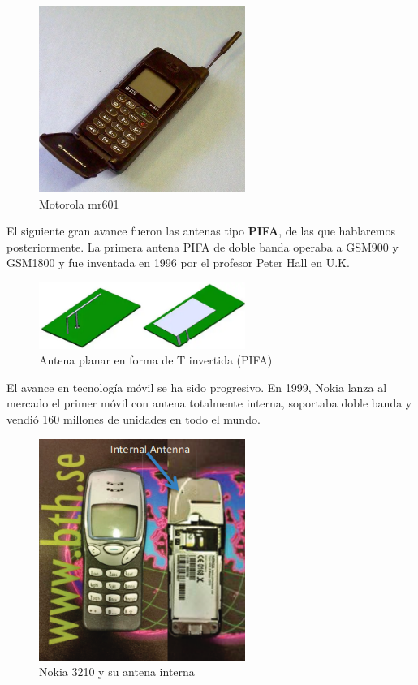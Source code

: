 \documentclass[a4paper,11pt,titlepage]{article}
\begin{document}
\begin{figure}[H]
\centering
\includegraphics[width=0.6\textwidth]{motorolamr601}
\caption{Motorola mr601}
\label{motorolamr601}
\end{figure}
\par
El siguiente gran avance fueron las antenas tipo \textbf{PIFA}, de las que hablaremos posteriormente. La primera antena PIFA de doble banda operaba a GSM900 y GSM1800 y fue inventada en 1996 por el profesor Peter Hall en U.K.
\par
\begin{figure}[H]
\centering
\includegraphics[width=0.6\textwidth]{pifa1}
\caption{Antena planar en forma de T invertida (PIFA)}
\label{pifa1}
\end{figure}
El avance en tecnología móvil se ha sido progresivo. En 1999, Nokia lanza al mercado el primer móvil con antena totalmente interna, soportaba doble banda y vendió 160 millones de unidades en todo el mundo.
\begin{figure}[H]
\centering
\includegraphics[width=0.6\textwidth]{nokia3210}
\caption{Nokia 3210 y su antena interna}
\label{nokia3210}
\end{figure}
\end{document}

